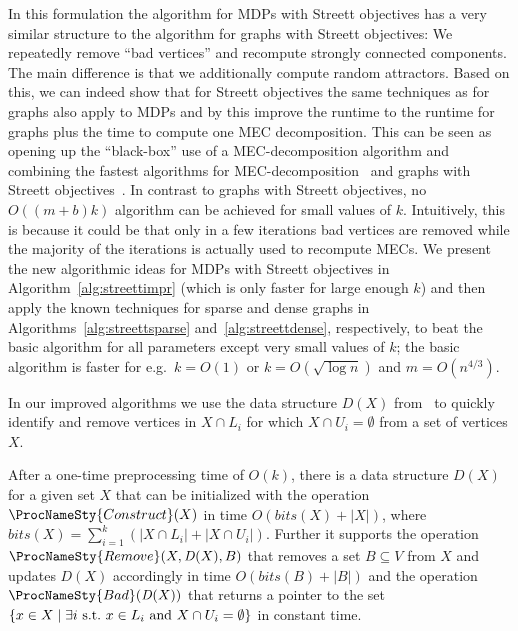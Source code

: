 \documentclass[11pt,letterpaper]{article}
\newcommand{\set}[1]{\{#1\}}
\newcommand{\ec}{X\xspace}
\newcommand{\inec}{\expandafter\MakeLowercase\expandafter{\ec}\xspace}
\newcommand{\remove}{\ProcNameSty{Remove}}
\newcommand{\bad}{\ProcNameSty{Bad}}
\newcommand{\construct}{\ProcNameSty{Construct}}
\newcommand{\bits}{\mathit{bits}\xspace}
\newcommand{\ds}{\mathit{D}\xspace}
\begin{document}
In this formulation the algorithm for MDPs with Streett objectives has a very 
similar structure to the algorithm for graphs with Streett objectives: 
We repeatedly remove ``bad vertices'' and recompute strongly connected components.
The main difference is that we additionally compute random attractors.
Based on this, we can indeed show that for Streett objectives 
the same techniques as for graphs also apply to MDPs and by this improve the 
runtime to the runtime for graphs plus the time to compute one MEC decomposition.
This can be seen as opening up the ``black-box''
use of a MEC-decomposition algorithm and combining the fastest algorithms for 
MEC-decomposition~\cite{ChatterjeeH11,ChatterjeeH14} and graphs with Streett 
objectives~\cite{HenzingerT96,ChatterjeeHL15}.
In contrast to graphs with Streett objectives, no $O((m+b)k)$
algorithm can be achieved for small values of $k$. Intuitively, this is because
it could be that only in a few iterations bad vertices are removed while
the majority of the iterations is actually used to recompute MECs.
We present the new algorithmic ideas for MDPs with Streett objectives in 
Algorithm~\ref{alg:streettimpr} (which is only faster for large enough $k$)
and then apply the known techniques for sparse and dense graphs in 
Algorithms~\ref{alg:streettsparse} and~\ref{alg:streettdense},
respectively, to beat the basic algorithm for all parameters except very small 
values of $k$; the basic algorithm is faster for e.g.\ $k = O(1)$ or $k = O(\sqrt{\log n})$ and $m = O(n^{4/3})$.

In our improved algorithms we use the data structure $\ds(\ec)$
from~\cite{HenzingerT96} to quickly identify and remove vertices in 
$\ec \cap L_i$ for which $\ec \cap U_i = \emptyset$ from a set of vertices $\ec$.
\begin{lemma}\label{lem:ds}
After a one-time preprocessing time of $O(k)$, there is a data structure 
$\ds(\ec)$ for a given set $\ec$ that can be initialized with the operation 
$\construct(\ec)$ in time $O(\bits(\ec) + \lvert \ec \rvert)$, where 
$\bits(\ec) = \sum_{i = 1}^k
\left( \lvert \ec \cap L_i \rvert + \lvert \ec \cap U_i \rvert \right)$. 
Further it supports the operation $\remove(\ec, \ds(\ec), B)$ that removes 
a set $B \subseteq V$ from $\ec$ and updates $\ds(\ec)$ accordingly in 
time $O(\bits(B) + \lvert B \rvert)$ and the operation $\bad(\ds(\ec))$
that returns a pointer to 
the set $\set{\inec \in \ec \mid \exists i \text{ s.t.\ } \inec \in L_i 
\text{ and } \ec \cap U_i = \emptyset}$ in constant time.
\end{lemma}
\end{document}
